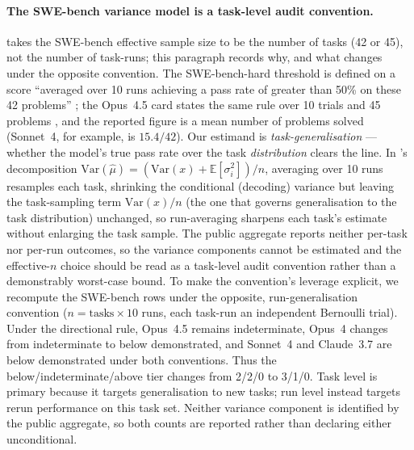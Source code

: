 \documentclass{article}
\begin{document}
\paragraph{The SWE-bench variance model is a task-level audit convention.}
 takes the SWE-bench effective sample size to be the number of tasks
(42 or 45), not the number of task-runs; this paragraph records why, and what changes
under the opposite convention. The SWE-bench-hard threshold is defined on a score
``averaged over 10 runs achieving a pass rate of greater than 50\% on these 42 problems''
\citep{anthropic2025opus4card}; the Opus~4.5 card states the same rule over 10 trials and
45 problems \citep{anthropic2025opus45}, and the reported figure is a mean number of
problems solved (Sonnet~4, for example, is $15.4/42$). Our estimand is
\emph{task-generalisation} --- whether the model's true pass rate over the task
\emph{distribution} clears the line. In \citet{miller2024adding}'s decomposition
$\mathrm{Var}(\hat\mu)=(\mathrm{Var}(x)+\mathbb{E}[\sigma_i^2])/n$, averaging over 10 runs
resamples each task, shrinking the conditional (decoding) variance but leaving the
task-sampling term $\mathrm{Var}(x)/n$ (the one that governs generalisation to the task
distribution) unchanged, so run-averaging sharpens each task's estimate without
enlarging the task sample. The public aggregate reports neither per-task nor per-run
outcomes, so the variance components cannot be estimated and the effective-$n$ choice
should be read as a task-level audit convention rather than a demonstrably worst-case
bound. To make the convention's leverage explicit, we recompute the SWE-bench rows under
the opposite, run-generalisation convention ($n = \text{tasks}\times10$ runs, each
task-run an independent Bernoulli trial). Under the directional rule, Opus~4.5 remains
indeterminate, Opus~4 changes from indeterminate to below demonstrated, and Sonnet~4 and
Claude~3.7 are below demonstrated under both conventions. Thus the
below/indeterminate/above tier changes from 2/2/0 to 3/1/0. Task level is primary because it
targets generalisation to new tasks; run level instead
targets rerun performance on this task set. Neither variance component is identified by the
public aggregate, so both counts are reported rather than declaring either unconditional.
\end{document}
